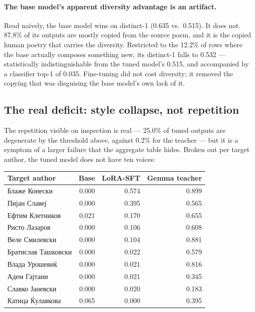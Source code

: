 \documentclass[11pt]{article}
\begin{document}
\paragraph{The base model's apparent diversity advantage is an artifact.}
Read naively, the base model wins on distinct-1 (0.635 vs.\ 0.515). It does
not. 87.8\% of its outputs are mostly copied from the source poem, and it is
the copied human poetry that carries the diversity. Restricted to the 12.2\%
of rows where the base actually composes something new, its distinct-1 falls
to 0.532 --- statistically indistinguishable from the tuned model's 0.515,
and accompanied by a classifier top-1 of 0.035. Fine-tuning did not cost
diversity; it removed the copying that was disguising the base model's own
lack of it.

\subsection{The real deficit: style collapse, not repetition}

The repetition visible on inspection is real --- 25.0\% of tuned outputs are
degenerate by the threshold above, against 0.2\% for the teacher --- but it
is a symptom of a larger failure that the aggregate table hides. Broken out
per target author, the tuned model does not have ten voices:

\begin{center}
\begin{tabular}{lrrr}
\toprule
Target author & Base & LoRA-SFT & Gemma teacher \\
\midrule
Блаже Конески       & 0.000 & 0.574 & 0.899 \\
Пијан Славеј        & 0.000 & 0.395 & 0.565 \\
Ефтим Клетников     & 0.021 & 0.170 & 0.655 \\
Ристо Лазаров       & 0.000 & 0.106 & 0.608 \\
Веле Смилевски      & 0.000 & 0.104 & 0.881 \\
Братислав Ташковски & 0.000 & 0.022 & 0.579 \\
Влада Урошевиќ      & 0.000 & 0.021 & 0.816 \\
Адем Гајтани        & 0.000 & 0.021 & 0.345 \\
Славко Јаневски     & 0.000 & 0.020 & 0.183 \\
Катица Ќулавкова    & 0.065 & 0.000 & 0.395 \\
\bottomrule
\end{tabular}
\end{center}
\end{document}
